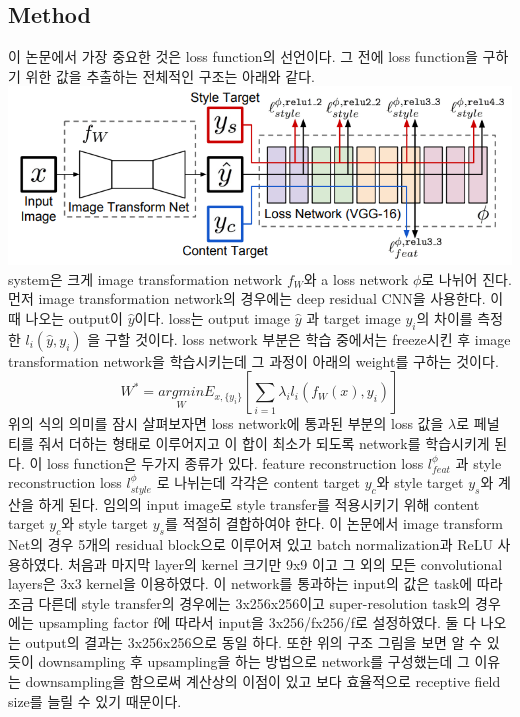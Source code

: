 \documentclass[extendedabs]{bmvc2k}
\begin{document}
 \subsection{Method}
 \quad 이 논문에서 가장 중요한 것은 loss function의 선언이다. 그 전에 loss function을 구하기 위한 값을 추출하는 전체적인 구조는 아래와 같다.
 \newline  \includegraphics[width=\linewidth]{images/00_style.PNG}
  system은 크게 image transformation network $f_W$와 a loss network $\phi$로 나뉘어 진다. 먼저 image transformation network의 경우에는
  deep residual CNN을 사용한다. 이 때 나오는 output이 $\hat{y}$이다. loss는 output image $\hat{y}$ 과 target image $y_i$의 차이를 측정한 
  $l_i(\hat{y},y_i)$ 을 구할 것이다. loss network 부분은 학습 중에서는 freeze시킨 후 image transformation network을 학습시키는데 그 과정이 아래의 weight를 구하는 것이다.
  $$W^* = \underset{W}{argmin}E_{x,\{y_i\}}[\sum_{i=1}\lambda_il_i(f_W(x),y_i)]$$
  위의 식의 의미를 잠시 살펴보자면 loss network에 통과된 부분의 loss 값을 $\lambda$로 페널티를 줘서 더하는 형태로 이루어지고 이 합이 최소가 되도록 network를 학습시키게 된다.
  이 loss function은 두가지 종류가 있다. feature reconstruction loss $l_{feat}^{\phi}$ 과 style reconstruction loss $l_{style}^{\phi}$ 로 나뉘는데 각각은 content target $y_c$와 style target $y_s$와 계산을 하게 된다.
  임의의 input image로 style transfer를 적용시키기 위해 content target $y_c$와 style target $y_s$를 적절히 결합하여야 한다. 이 논문에서 image transform Net의 경우 5개의 
  residual block으로 이루어져 있고 batch normalization과 ReLU 사용하였다. 처음과 마지막 layer의 kernel 크기만 9x9 이고 그 외의 모든 convolutional layers은 3x3 kernel을 이용하였다.
  이 network를 통과하는 input의 값은 task에 따라 조금 다른데 style transfer의 경우에는 3x256x256이고 super-resolution task의 경우에는 upsampling factor f에 따라서 input을 3x256/fx256/f로 설정하였다.
  둘 다 나오는 output의 결과는 3x256x256으로 동일 하다. 또한 위의 구조 그림을 보면 알 수 있듯이 downsampling 후 upsampling을 하는 방법으로 network를 구성했는데 그 이유는 downsampling을 함으로써 계산상의 이점이 있고 보다 효율적으로 receptive field size를 늘릴 수 있기 때문이다. 
\end{document}

